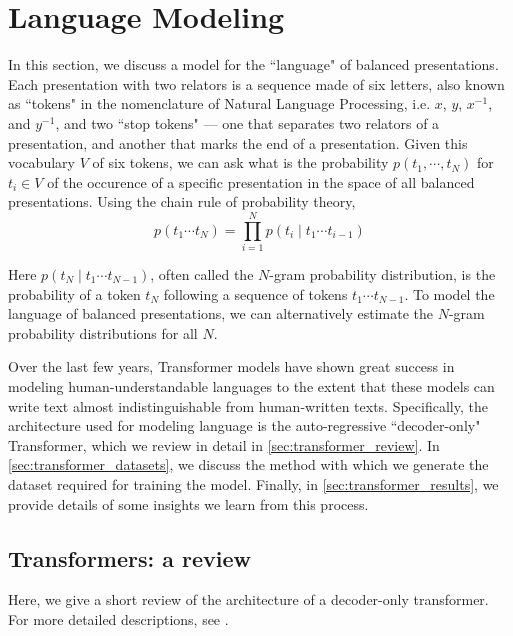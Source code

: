 
\section{Language Modeling} \label{sec:lm}

In this section, we discuss a model for the ``language" of balanced presentations. Each presentation with two relators is a sequence made of six letters, also known as ``tokens" in the nomenclature of Natural Language Processing, i.e. $x$, $y$, $x^{-1}$, and $y^{-1}$, and two ``stop tokens" --- one that separates two relators of a presentation, and another that marks the end of a presentation. Given this vocabulary $V$ of six tokens, we can ask what is the probability $p(t_1, \cdots, t_N)$ for $t_i \in V$ of the occurence of a specific presentation in the space of all balanced presentations. Using the chain rule of probability theory, 
\[
p(t_1 \cdots t_{N}) = \prod\limits_{i=1}^{N} p (t_{i} \mid t_{1} \cdots t_{i-1}) 
\]

Here $p (t_{N} \mid t_{1} \cdots t_{N-1})$, often called the $N$-gram probability distribution, is the probability of a token $t_N$ following a sequence of tokens $t_{1} \cdots t_{N-1}$. To model the language of balanced presentations, we can alternatively estimate the $N$-gram probability distributions for all $N$. 

Over the last few years, Transformer models have shown great success in modeling human-understandable languages to the extent that these models can write text almost indistinguishable from human-written texts. Specifically, the architecture used for modeling language is the auto-regressive ``decoder-only" Transformer, which we review in detail in \autoref{sec:transformer_review}. In \autoref{sec:transformer_datasets}, we discuss the method with which we generate the dataset required for training the model. Finally, in \autoref{sec:transformer_results}, we provide details of some insights we learn from this process. 

\subsection{Transformers: a review\label{sec:transformer_review}}

Here, we give a short review of the architecture of a decoder-only transformer. For more detailed descriptions, see \cite{vaswani2023attention, elhage2021mathematical, douglas2023large}. 

